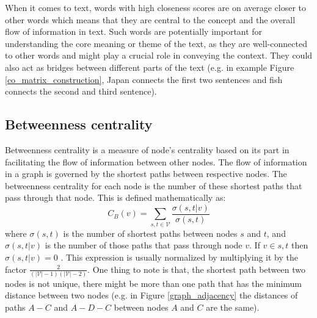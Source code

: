 \documentclass[12pt]{article}
\numberwithin{equation}{section}
\begin{document}
\begin{spacing}{1.5}
	When it comes to text, words with high closeness scores are on average closer to other words which means that they are central to the concept and the overall flow of information in text. Such words are potentially important for understanding the core meaning or theme of the text, as they are well-connected to other words and might play a crucial role in conveying the context. They could also act as bridges between different parts of the text (e.g. in example Figure \ref{co_matrix_construction}, Japan connects the first two sentences and fish connects the second and third sentence).
	
	\subsection{Betweenness centrality}
	Betweenness centrality is a measure of node's centrality based on its part in facilitating the flow of information between other nodes. The flow of information in a graph is governed by the shortest paths between respective nodes. The betweenness centrality for each node is the number of these shortest paths that pass through that node. This is defined mathematically as:
	\begin{equation}
		C_B(v) = \sum_{s,t \in \mathcal{V}} \frac{\sigma(s, t|v)}{\sigma(s,t)}
	\end{equation}
	where $\sigma(s,t)$ is the number of shortest paths between nodes $s$ and $t$, and $\sigma(s, t|v)$ is the number of those paths that pass through node $v$. If $v \in s, t$ then $\sigma(s, t|v) = 0$ \cite{freeman}. This expression is usually normalized by multiplying it by the factor $\frac{2}{(|\mathcal{V}| -1)(|\mathcal{V}| - 2)}$. One thing to note is that, the shortest path between two nodes is not unique, there might be more than one path that has the minimum distance between two nodes (e.g. in Figure \ref{graph_adjacency} the distances of paths $A - C$ and $A - D - C$ between nodes $A$ and $C$ are the same).
	

\end{spacing}
\end{document}
